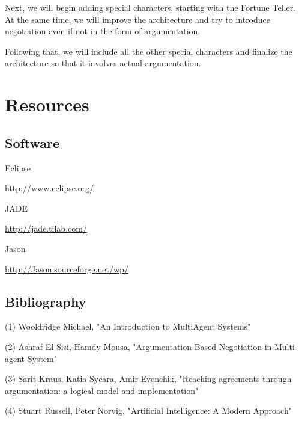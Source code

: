 \documentclass{article}
\begin{document}
Next, we will begin adding special characters, starting with the Fortune Teller. At the same time, we will improve the architecture and try to introduce negotiation even if not in the form of argumentation.

Following that, we will include all the other special characters and finalize the architecture so that it involves actual argumentation.

\section{Resources}

\subsection{Software}
Eclipse \par
\url{http://www.eclipse.org/} \par
\vspace{3mm}
JADE \par
\url{http://jade.tilab.com/} \par 
\vspace{3mm}
Jason \par
\url{http://Jason.sourceforge.net/wp/} \par 

\subsection{Bibliography}
\noindent
(1) Wooldridge Michael, "An Introduction to MultiAgent Systems"

\noindent
(2) Ashraf El-Sisi, Hamdy Mousa, "Argumentation Based Negotiation in Multi-agent System"

\noindent
(3) Sarit Kraus, Katia Sycara, Amir Evenchik, "Reaching agreements through argumentation: a logical model and implementation"

\noindent
(4) Stuart Russell, Peter Norvig, "Artificial Intelligence: A Modern Approach"
\end{document}

